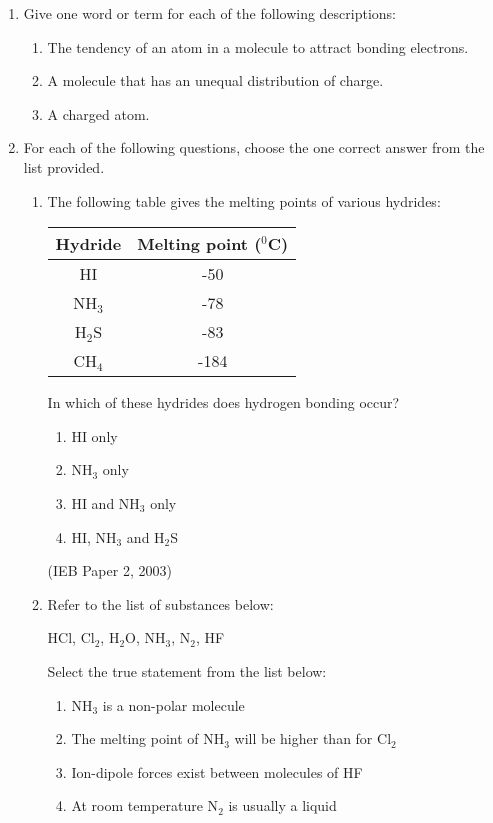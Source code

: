 \begin{eocexercises}{}
\begin{enumerate}
\item{Give one word or term for each of the following descriptions:}
\begin{enumerate}
\item{The tendency of an atom in a molecule to attract bonding electrons.}
\item{A molecule that has an unequal distribution of charge.}
\item{A charged atom.}
\end{enumerate}

\item{For each of the following questions, choose the one correct answer from the list provided.}
\begin{enumerate}
\item{The following table gives the melting points of various hydrides:}
\begin{center}
\begin{tabular}{|c|c|}\hline
\textbf{Hydride} & \textbf{Melting point} ($^{0}$C) \\\hline
HI & -50 \\\hline
NH$_{3}$ & -78 \\\hline
H$_{2}$S & -83 \\\hline
CH$_{4}$ & -184 \\\hline
\end{tabular}
\end{center}

In which of these hydrides does hydrogen bonding occur?
\begin{enumerate}
\item{HI only}
\item{NH$_{3}$ only}
\item{HI and NH$_{3}$ only}
\item{HI, NH$_{3}$ and H$_{2}$S}
\end{enumerate}
(IEB Paper 2, 2003)

\item{Refer to the list of substances below:}
\begin{center}
HCl, Cl$_{2}$, H$_{2}$O, NH$_{3}$, N$_{2}$, HF
\end{center}
Select the true statement from the list below:
\begin{enumerate}
\item{NH$_{3}$ is a non-polar molecule}
\item{The melting point of NH$_{3}$ will be higher than for Cl$_{2}$}
\item{Ion-dipole forces exist between molecules of HF}
\item{At room temperature N$_{2}$ is usually a liquid}
\end{enumerate}
\end{enumerate}


\end{enumerate}
\end{eocexercises}
